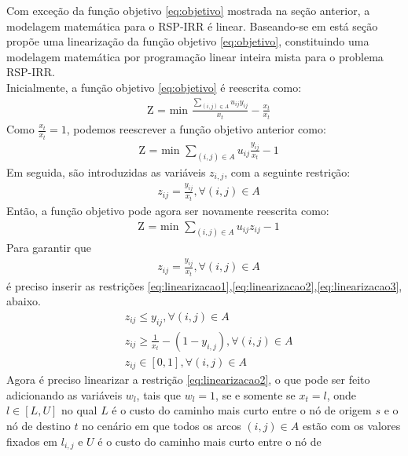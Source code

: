 ﻿Com exceção da função objetivo \eqref{eq:objetivo} mostrada na seção anterior, a modelagem matemática para o RSP-IRR é linear.
Baseando-se em \cite{Bisschop2005} está seção propõe uma linearização da função objetivo \eqref{eq:objetivo}, constituindo uma modelagem
matemática por programação linear inteira mista para o problema RSP-IRR. \\
Inicialmente, a função objetivo \eqref{eq:objetivo} é reescrita como: \\
\begin{align}
    & \text{Z = min } \frac{\sum\limits_{(i,j) \in A} u_{ij}y_{ij}}{x_t} - \frac{x_t}{x_t} \nonumber
\end{align}
Como $\frac{x_t}{x_t} = 1$, podemos reescrever a função objetivo anterior como:
\begin{align}
    & \text{Z = min } \sum\limits_{(i,j) \in A} u_{ij}\frac{y_{ij}}{x_t} - 1 \nonumber
\end{align}
Em seguida, são introduzidas as variáveis $z_{i,j}$, com a seguinte restrição:
\begin{align}
    & z_{ij} = \frac{y_{ij}}{x_t}, \forall (i,j) \in A \nonumber
\end{align}
Então, a função objetivo pode agora ser novamente reescrita como:
\begin{align}
    & \text{Z = min } \sum\limits_{(i,j) \in A} u_{ij}z_{ij} - 1 \label{eq:objetivolinear}
\end{align}
Para garantir que 
\begin{align}
    & z_{ij} = \frac{y_{ij}}{x_t}, \forall (i,j) \in A \nonumber
\end{align}
é preciso inserir as restrições \eqref{eq:linearizacao1},\eqref{eq:linearizacao2},\eqref{eq:linearizacao3}, abaixo.
\begin{align}
    & z_{ij} \leq y_{ij}, \forall (i,j) \in A  \label{eq:linearizacao1}\\
    & z_{ij} \geq \frac{1}{x_t} - (1 - y_{i,j}), \forall (i,j) \in A  \label{eq:linearizacao2}\\
    & z_{ij} \in [0,1], \forall (i,j) \in A \label{eq:linearizacao3}
\end{align}
Agora é preciso linearizar a restrição \eqref{eq:linearizacao2}, o que pode ser feito adicionando as variáveis $w_l$, tais que
$w_l = 1$, se e somente se $x_t = l$, onde $l \in [L,U]$ no qual $L$ é o custo do caminho mais curto entre o nó de origem $s$ e o nó de destino $t$ 
no cenário em que todos os arcos $(i,j) \in A$ estão com os valores fixados em $l_{i,j}$ e $U$ é o custo do caminho mais curto entre o nó de 
